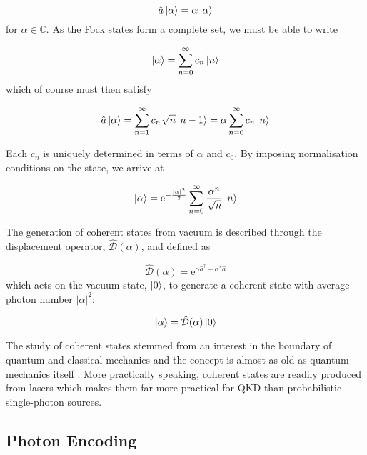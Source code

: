 \begin{equation}
	\hat{a}\ket{\alpha} = \alpha\ket{\alpha}
\end{equation}
for $\alpha \in \mathbb{C}$. As the Fock states form a complete set, we must be able to write

\begin{equation}
	\ket{\alpha} = \sum_{n=0}^\infty c_n \ket{n}
\end{equation}
which of course must then satisfy

\begin{equation}
	\hat{a}\ket{\alpha} = \sum_{n=1}^\infty c_n \sqrt{n} \ket{n-1} = \alpha  \sum_{n=0}^\infty c_n \ket{n}
\end{equation}

Each $c_n$ is uniquely determined in terms of $\alpha$ and $c_0$. By imposing normalisation conditions on the state, we arrive at

\begin{equation}
	\ket{\alpha} = \mathrm{e}^{-\frac{|\alpha|^2}{2}} \sum_{n=0}^\infty \frac{\alpha^n}{\sqrt{n}} \ket{n} 
\end{equation}

The generation of coherent states from vacuum is described through the displacement operator, $\hat{\mathcal{D}}(\alpha)$, and defined as

\begin{equation}
	\hat{\mathcal{D}}(\alpha) = \mathrm{e}^{\alpha\hat{a}^\dagger - \alpha^\ast\hat{a}}
\end{equation}
which acts on the vacuum state, $\ket{0}$, to generate a coherent state with average photon number $|\alpha|^2$:

\begin{equation}
	\ket{\alpha} = \hat{\mathcal{D}}(\alpha)\ket{0}
\end{equation}

The study of coherent states stemmed from an interest in the boundary of quantum and classical mechanics and the concept is almost as old as quantum mechanics itself \cite{Schrodinger1926}. More practically speaking, coherent states are readily produced from lasers which makes them far more practical for \ac{QKD} than probabilistic single-photon sources.

\subsection{Photon Encoding}
\label{sec:photon_encoding}

